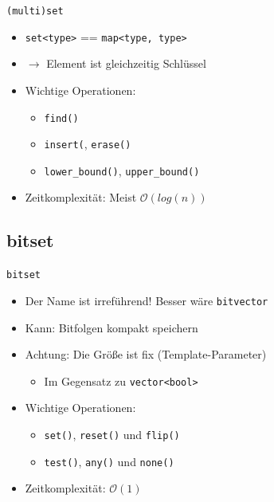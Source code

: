 \begin{frame}{\texttt{(multi)set}}
	\begin{itemize}
		\item \texttt{set<type>} == \texttt{map<type, type>}
		\item $\rightarrow$ Element ist gleichzeitig Schlüssel
		\pause
		\item Wichtige Operationen:
		\begin{itemize}
			\item \texttt{find()}
			\item \texttt{insert(}, \texttt{erase()}
			\item \texttt{lower\_bound()}, \texttt{upper\_bound()}
		\end{itemize}
		\pause
		\item Zeitkomplexität: Meist $\mathcal{O}(log(n))$
	\end{itemize}
\end{frame}

\subsection{bitset}

\begin{frame}{\texttt{bitset}}
	\begin{itemize}
		\item Der Name ist irreführend! Besser wäre \texttt{bitvector}
		\item Kann: Bitfolgen kompakt speichern
		\item Achtung: Die Größe ist fix (Template-Parameter)
		\begin{itemize}
			\item Im Gegensatz zu \texttt{vector<bool>}
		\end{itemize}
		\pause
		\item Wichtige Operationen:
		\begin{itemize}
			\item \texttt{set()}, \texttt{reset()} und \texttt{flip()}
			\item \texttt{test()}, \texttt{any()} und \texttt{none()}
		\end{itemize}
		\item Zeitkomplexität: $\mathcal{O}(1)$
	\end{itemize}
\end{frame}

